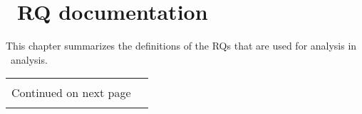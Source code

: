 \chapter{\gtest\ RQ documentation}
\label{chapter:gastestRQ}

This chapter summarizes the definitions of the RQs that are used for analysis in \gtest\ analysis. 

\begin{center}
	
	\begin{longtable}[!htbp]{|l||*{5}{c|}}\hline
		
		\makebox[7em]{RQ name}&\makebox[5em]{shape}&\makebox[3em]{type}&\makebox[2em]{unit}&\makebox[3em]{default}%
		\\\hline\hline 
		\endfirsthead
		
		\makebox[7em]{RQ name}&\makebox[5em]{shape}&\makebox[3em]{type}&\makebox[2em]{unit}&\makebox[2.5em]{default}%
		\\\hline\hline
		\endhead
		
		\hline \multicolumn{5}{|r|}{{Continued on next page}} \\ \hline
		\endfoot
		
		\endlastfoot
		

\end{longtable}
\end{center}
